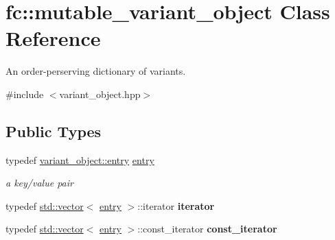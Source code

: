 \hypertarget{classfc_1_1mutable__variant__object}{}\section{fc\+:\+:mutable\+\_\+variant\+\_\+object Class Reference}
\label{classfc_1_1mutable__variant__object}


An order-\/perserving dictionary of variant\textquotesingle{}s.  




{\ttfamily \#include $<$variant\+\_\+object.\+hpp$>$}

\subsection*{Public Types}
\begin{DoxyCompactItemize}
\item 
\mbox{\label{classfc_1_1mutable__variant__object_af1bee50fbfdee30defa012c06dbe8107}} 
typedef \mbox{\hyperlink{classfc_1_1variant__object_1_1entry}{variant\+\_\+object\+::entry}} \mbox{\hyperlink{classfc_1_1mutable__variant__object_af1bee50fbfdee30defa012c06dbe8107}{entry}}
\begin{DoxyCompactList}\small\item\em a key/value pair \end{DoxyCompactList}\item 
\mbox{\label{classfc_1_1mutable__variant__object_aa1ee6b6af5b666fced4261b3fd808be0}} 
typedef \mbox{\hyperlink{classstd_1_1vector}{std\+::vector}}$<$ \mbox{\hyperlink{classfc_1_1mutable__variant__object_af1bee50fbfdee30defa012c06dbe8107}{entry}} $>$\+::iterator {\bfseries iterator}
\item 
\mbox{\label{classfc_1_1mutable__variant__object_aaf119e677f1969d7b12699591f9bce34}} 
typedef \mbox{\hyperlink{classstd_1_1vector}{std\+::vector}}$<$ \mbox{\hyperlink{classfc_1_1mutable__variant__object_af1bee50fbfdee30defa012c06dbe8107}{entry}} $>$\+::const\+\_\+iterator {\bfseries const\+\_\+iterator}
\end{DoxyCompactItemize}
